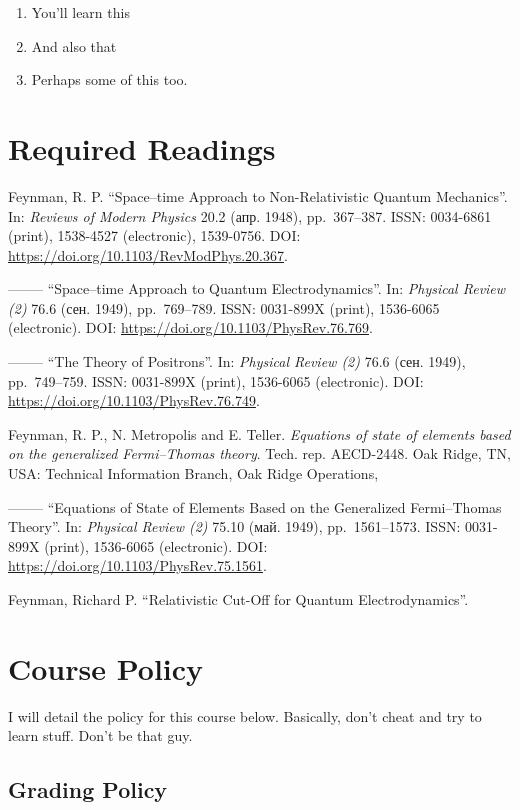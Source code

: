 \documentclass[]{article}
\begin{document}
\begin{enumerate}
\def\labelenumi{\arabic{enumi}.}
\item
  You'll learn this
\item
  And also that
\item
  Perhaps some of this too.
\end{enumerate}

\section{Required Readings}\label{required-readings}

Feynman, R. P. ``Space--time Approach to Non-Relativistic Quantum
Mechanics''. In: \emph{Reviews of Modern Physics} 20.2 (апр. 1948),
pp.~367--387. ISSN: 0034-6861 (print), 1538-4527 (electronic),
1539-0756. DOI: \url{https://doi.org/10.1103/RevModPhys.20.367}.

-------- ``Space--time Approach to Quantum Electrodynamics''. In:
\emph{Physical Review (2)} 76.6 (сен. 1949), pp.~769--789. ISSN:
0031-899X (print), 1536-6065 (electronic). DOI:
\url{https://doi.org/10.1103/PhysRev.76.769}.

-------- ``The Theory of Positrons''. In: \emph{Physical Review (2)}
76.6 (сен. 1949), pp.~749--759. ISSN: 0031-899X (print), 1536-6065
(electronic). DOI: \url{https://doi.org/10.1103/PhysRev.76.749}.

Feynman, R. P., N. Metropolis and E. Teller.
\emph{Equations of state of elements based on the
generalized Fermi--Thomas theory}. Tech. rep. AECD-2448. Oak Ridge, TN,
USA: Technical Information Branch, Oak Ridge Operations,

-------- ``Equations of State of Elements Based on the Generalized
Fermi--Thomas Theory''. In: \emph{Physical Review (2)} 75.10 (май.
1949), pp.~1561--1573. ISSN: 0031-899X (print), 1536-6065 (electronic).
DOI: \url{https://doi.org/10.1103/PhysRev.75.1561}.

Feynman, Richard P. ``Relativistic Cut-Off for Quantum
Electrodynamics''.

\section{Course Policy}\label{course-policy}

I will detail the policy for this course below. Basically, don't cheat
and try to learn stuff. Don't be that guy.

\subsection{Grading Policy}\label{grading-policy}
\end{document}
